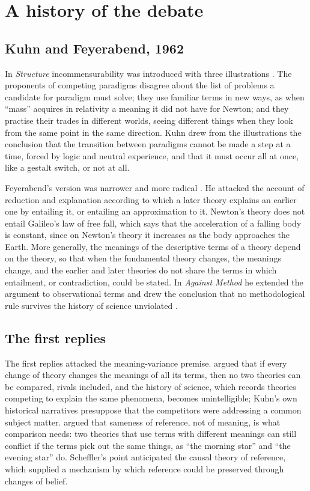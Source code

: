 \documentclass{situationist-preprint}
\begin{document}
\section{A history of the debate}\label{s:history}

\subsection{Kuhn and Feyerabend, 1962}

In \emph{Structure} incommensurability was introduced with three illustrations \citep[ch.~12]{Kuhn1970}. The proponents of competing paradigms disagree about the list of problems a candidate for paradigm must solve; they use familiar terms in new ways, as when \enquote{mass} acquires in relativity a meaning it did not have for Newton; and they practise their trades in different worlds, seeing different things when they look from the same point in the same direction. Kuhn drew from the illustrations the conclusion that the transition between paradigms cannot be made a step at a time, forced by logic and neutral experience, and that it must occur all at once, like a gestalt switch, or not at all.

Feyerabend's version was narrower and more radical \citep{Feyerabend1962}. He attacked the account of reduction and explanation according to which a later theory explains an earlier one by entailing it, or entailing an approximation to it. Newton's theory does not entail Galileo's law of free fall, which says that the acceleration of a falling body is constant, since on Newton's theory it increases as the body approaches the Earth. More generally, the meanings of the descriptive terms of a theory depend on the theory, so that when the fundamental theory changes, the meanings change, and the earlier and later theories do not share the terms in which entailment, or contradiction, could be stated. In \emph{Against Method} he extended the argument to observational terms and drew the conclusion that no methodological rule survives the history of science unviolated \citep{Feyerabend1975}.

\subsection{The first replies}

The first replies attacked the meaning-variance premise. \citet{Shapere1966} argued that if every change of theory changes the meanings of all its terms, then no two theories can be compared, rivals included, and the history of science, which records theories competing to explain the same phenomena, becomes unintelligible; Kuhn's own historical narratives presuppose that the competitors were addressing a common subject matter. \citet{Scheffler1967} argued that sameness of reference, not of meaning, is what comparison needs: two theories that use terms with different meanings can still conflict if the terms pick out the same things, as \enquote{the morning star} and \enquote{the evening star} do. Scheffler's point anticipated the causal theory of reference, which supplied a mechanism by which reference could be preserved through changes of belief.
\end{document}
